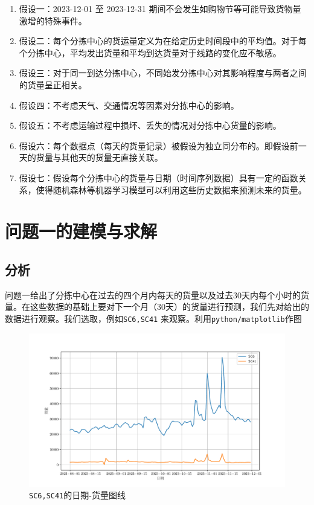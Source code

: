 \documentclass[UTF8]{article}%
\begin{document}
\begin{enumerate}
    \item 假设一：2023-12-01 至 2023-12-31 期间不会发生如购物节等可能导致货物量激增的特殊事件。
    \item 假设二：每个分拣中心的货运量定义为在给定历史时间段中的平均值。对于每个分拣中心，平均发出货量和平均到达货量对于线路的变化应不敏感。
    \item 假设三：对于同一到达分拣中心，不同始发分拣中心对其影响程度与两者之间的货量呈正相关。
    \item 假设四：不考虑天气、交通情况等因素对分拣中心的影响。
    \item 假设五：不考虑运输过程中损坏、丢失的情况对分拣中心货量的影响。
    \item 假设六：每个数据点（每天的货量记录）被假设为独立同分布的。即假设前一天的货量与其他天的货量无直接关联。
    \item 假设七：假设每个分拣中心的货量与日期（时间序列数据）具有一定的函数关系，使得随机森林等机器学习模型可以利用这些历史数据来预测未来的货量。
\end{enumerate}

\clearpage
\section{问题一的建模与求解}
\subsection{分析}
问题一给出了分拣中心在过去的四个月内每天的货量以及过去30天内每个小时的货量。在这些数据的基础上要对下一个月（30天）的货量进行预测，我们先对给出的数据进行观察。我们选取，例如{\tt SC6,SC41} 来观察。利用{\tt python/matplotlib}作图

\begin{figure}[!ht]
	\centering
	\includegraphics*[width=0.8\linewidth]{images/example.pdf}
	\caption{{\tt SC6,SC41}的日期-货量图线}
\end{figure}
\end{document}
